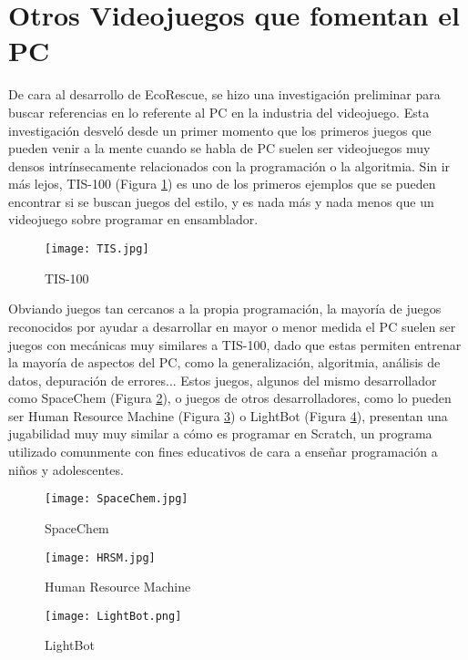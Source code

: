 \section{Otros Videojuegos que fomentan el PC}
De cara al desarrollo de EcoRescue, se hizo una investigación preliminar para buscar referencias en lo referente al PC en la industria del videojuego. Esta investigación desveló desde un primer momento que los primeros juegos que pueden venir a la mente cuando se habla de PC suelen ser videojuegos muy densos intrínsecamente relacionados con la programación o la algoritmia. Sin ir más lejos, TIS-100\cite{TIS-100} (Figura \ref{fig:tis100}) es uno de los primeros ejemplos que se pueden encontrar si se buscan juegos del estilo, y es nada más y nada menos que un videojuego sobre programar en ensamblador. 

\begin{figure}[H]
    \centering
      \texttt{[image: TIS.jpg]}
    \caption{TIS-100}
    \label{fig:tis100}
\end{figure}

Obviando juegos tan cercanos a la propia programación, la mayoría de juegos reconocidos por ayudar a desarrollar en mayor o menor medida el PC suelen ser juegos con mecánicas muy similares a TIS-100, dado que estas permiten entrenar la mayoría de aspectos del PC, como la generalización, algoritmia, análisis de datos, depuración de errores... Estos juegos, algunos del mismo desarrollador como SpaceChem\cite{SpaceChem} (Figura \ref{fig:spaceChem}), o juegos de otros desarrolladores, como lo pueden ser Human Resource Machine\cite{hrsm} (Figura \ref{fig:hsrm}) o LightBot\cite{lightbot} (Figura \ref{fig:lightbot}), presentan una jugabilidad muy muy similar a cómo es programar en Scratch\cite{Scratch}, un programa utilizado comunmente con fines educativos de cara a enseñar programación a niños y adolescentes.

\begin{figure}[H]
    \centering
      \texttt{[image: SpaceChem.jpg]}
    \caption{SpaceChem}
    \label{fig:spaceChem}
\end{figure}

\begin{figure}[H]
    \centering
      \texttt{[image: HRSM.jpg]}
    \caption{Human Resource Machine}
    \label{fig:hsrm}
\end{figure}

\begin{figure}[H]
    \centering
      \texttt{[image: LightBot.png]}
    \caption{LightBot}
    \label{fig:lightbot}
\end{figure}

